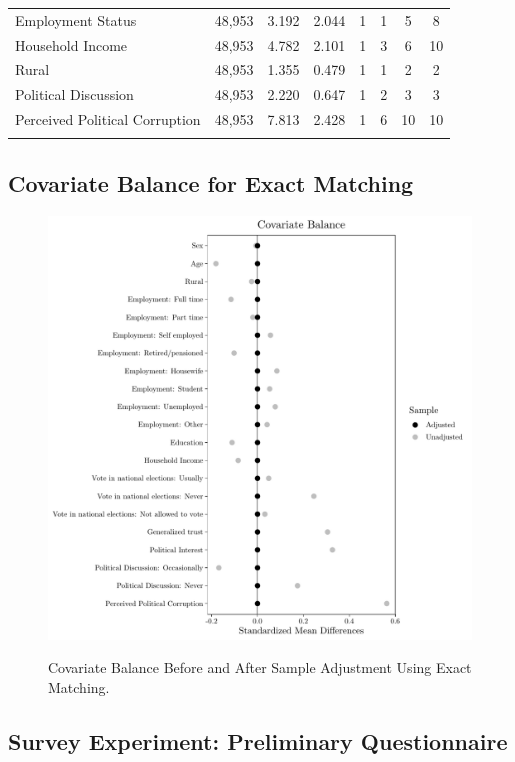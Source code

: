 \documentclass[11pt, ngerman,english,a4]{article}
\begin{document}
\begin{table}[!htbp]
\begin{tabular}{@{\extracolsep{5pt}}lccccccc}
Employment Status & 48,953 & 3.192 & 2.044 & 1 & 1 & 5 & 8 \\ 
Household Income & 48,953 & 4.782 & 2.101 & 1 & 3 & 6 & 10 \\ 
Rural & 48,953 & 1.355 & 0.479 & 1 & 1 & 2 & 2 \\ 
Political Discussion & 48,953 & 2.220 & 0.647 & 1 & 2 & 3 & 3 \\ 
Perceived Political Corruption & 48,953 & 7.813 & 2.428 & 1 & 6 & 10 & 10 \\ 
\hline \\[-1.8ex] 
\end{tabular} 
\end{table} 

\subsection*{Covariate Balance for Exact Matching}

\begin{figure}[H]
    \caption{Covariate Balance Before and After Sample Adjustment Using Exact Matching.}
    \centering
    \includegraphics[width=0.9\linewidth]{covbalance_exact.pdf}
    \label{fig:balance}
\end{figure}

\newpage

\subsection*{Survey Experiment: Preliminary Questionnaire} 
\end{document}
